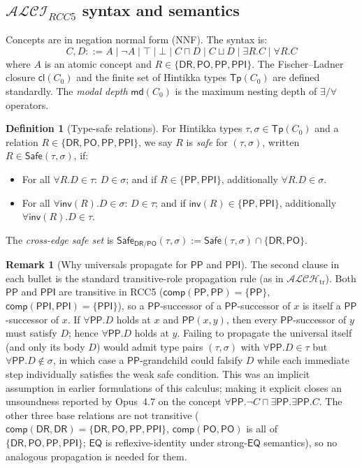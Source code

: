 \documentclass[a4paper,11pt]{article}
\theoremstyle{definition}
\newtheorem{definition}[theorem]{Definition}
\newtheorem{remark}[theorem]{Remark}
\newcommand{\ALCIRCC}[1]{\ensuremath{\mathcal{ALCI}_{\mathit{RCC#1}}}}
\newcommand{\DR}{\ensuremath{\mathsf{DR}}}
\newcommand{\PO}{\ensuremath{\mathsf{PO}}}
\newcommand{\EQ}{\ensuremath{\mathsf{EQ}}}
\newcommand{\PP}{\ensuremath{\mathsf{PP}}}
\newcommand{\PPI}{\ensuremath{\mathsf{PPI}}}
\newcommand{\inv}{\ensuremath{\mathsf{inv}}}
\newcommand{\comp}{\ensuremath{\mathsf{comp}}}
\newcommand{\cl}{\ensuremath{\mathsf{cl}}}
\newcommand{\Tp}{\ensuremath{\mathsf{Tp}}}
\newcommand{\Safe}{\ensuremath{\mathsf{Safe}}}
\newcommand{\md}{\ensuremath{\mathsf{md}}}
\newcommand{\RCCrels}{\{\DR,\PO,\PP,\PPI\}}
\begin{document}
\subsection{$\ALCIRCC{5}$ syntax and semantics}

Concepts are in negation normal form (NNF).  The syntax is:
\[
  C, D ::= A \mid \neg A \mid \top \mid \bot
    \mid C \sqcap D \mid C \sqcup D
    \mid \exists R.C \mid \forall R.C
\]
where $A$ is an atomic concept and $R \in \{\DR,\PO,\PP,\PPI\}$.
The Fischer--Ladner closure $\cl(C_0)$ and the finite set of
Hintikka types $\Tp(C_0)$ are defined standardly.
The \emph{modal depth} $\md(C_0)$ is the maximum nesting depth
of $\exists/\forall$ operators.

\begin{definition}[Type-safe relations]
\label{def:safe}
For Hintikka types $\tau, \sigma \in \Tp(C_0)$ and a relation
$R \in \RCCrels$, we say $R$ is \emph{safe} for $(\tau, \sigma)$,
written $R \in \Safe(\tau, \sigma)$, if:
\begin{itemize}[nosep]
  \item For all $\forall R.D \in \tau$: $D \in \sigma$; and
    if $R \in \{\PP, \PPI\}$, additionally $\forall R.D \in \sigma$.
  \item For all $\forall \inv(R).D \in \sigma$: $D \in \tau$; and
    if $\inv(R) \in \{\PP, \PPI\}$, additionally
    $\forall \inv(R).D \in \tau$.
\end{itemize}
The \emph{cross-edge safe set} is
$\Safe_{\DR/\PO}(\tau, \sigma) := \Safe(\tau, \sigma)
  \cap \{\DR, \PO\}$.
\end{definition}

\begin{remark}[Why universals propagate for $\PP$ and $\PPI$]
\label{rem:trans-propagation}
The second clause in each bullet is the standard transitive-role
propagation rule (as in $\mathcal{ALCH}_{\mathrm{tr}}$). Both $\PP$
and $\PPI$ are transitive in RCC5 ($\comp(\PP, \PP) = \{\PP\}$,
$\comp(\PPI, \PPI) = \{\PPI\}$), so a $\PP$-successor of a
$\PP$-successor of $x$ is itself a $\PP$-successor of $x$. If
$\forall \PP. D$ holds at $x$ and $\PP(x, y)$, then every
$\PP$-successor of $y$ must satisfy $D$; hence
$\forall \PP. D$ holds at $y$. Failing to propagate the universal
itself (and only its body $D$) would admit type pairs
$(\tau, \sigma)$ with $\forall \PP. D \in \tau$ but
$\forall \PP. D \notin \sigma$, in which case a $\PP$-grandchild
could falsify $D$ while each immediate step individually satisfies
the weak safe condition. This was an implicit assumption in earlier
formulations of this calculus; making it explicit closes an
unsoundness reported by Opus~4.7 on the concept
$\forall \PP. \neg C \sqcap \exists \PP. \exists \PP. C$. The
other three base relations are not transitive
($\comp(\DR, \DR) = \RCCrels$, $\comp(\PO, \PO)$ is all of
$\RCCrels$; $\EQ$ is reflexive-identity under strong-$\EQ$
semantics), so no analogous propagation is needed for them.
\end{remark}
\end{document}
